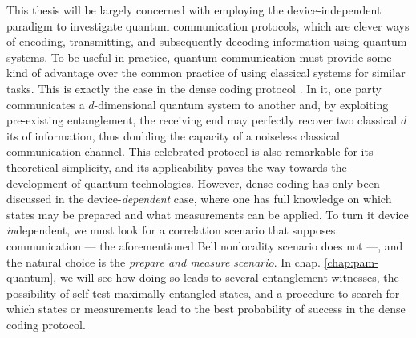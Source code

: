 This thesis will be largely concerned with employing the device-independent paradigm to investigate quantum communication protocols, which are clever ways of encoding, transmitting, and subsequently decoding information using quantum systems. To be useful in practice, quantum communication must provide some kind of advantage over the common practice of using classical systems for similar tasks. This is exactly the case in the dense coding protocol \cite{bennett_1992_superdense}. In it, one party communicates a $d$-dimensional quantum system to another and, by exploiting pre-existing entanglement, the receiving end may perfectly recover two classical $d$its of information, thus doubling the capacity of a noiseless classical communication channel. This celebrated protocol is also remarkable for its theoretical simplicity, and its applicability paves the way towards the development of quantum technologies. However, dense coding has only been discussed in the device-\emph{dependent} case, where one has full knowledge on which states may be prepared and what measurements can be applied. To turn it device \emph{in}dependent, we must look for a correlation scenario that supposes communication --- the aforementioned Bell nonlocality scenario does not ---, and the natural choice is the \emph{prepare and measure scenario}. In chap. \ref{chap:pam-quantum}, we will see how doing so leads to several entanglement witnesses, the possibility of self-test maximally entangled states, and a procedure to search for which states or measurements lead to the best probability of success in the dense coding protocol.

